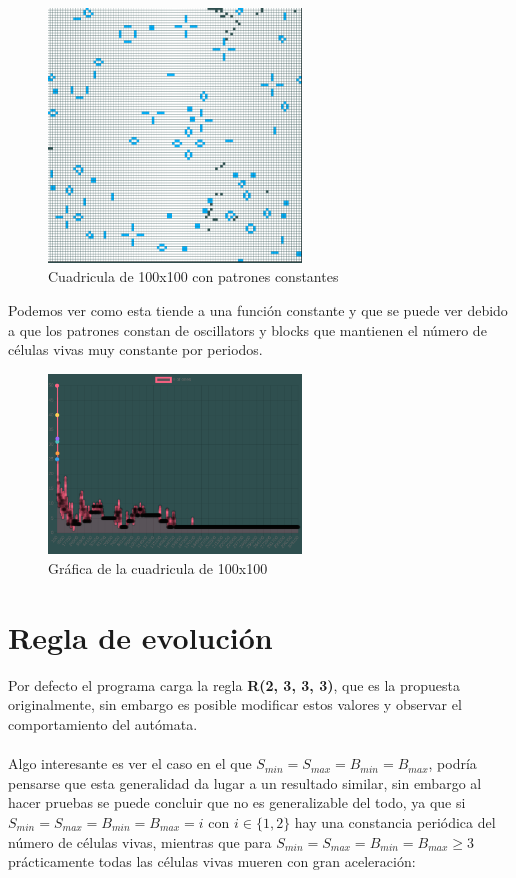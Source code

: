 \begin{figure}[h]
	\centering
	\includegraphics[width=0.6\textwidth]{capitulo2/images/time_grid.png}
	\caption{Cuadricula de 100x100 con patrones constantes}
	\label{fig:time_grid}
\end{figure}
Podemos ver como esta tiende a una función constante y que se puede ver debido a que los patrones constan de oscillators y blocks que mantienen el número de células vivas muy constante por periodos.
\begin{figure}[h]
	\centering
	\includegraphics[width=0.6\textwidth]{capitulo2/images/time_plot.png}
	\caption{Gráfica de la cuadricula de 100x100}
	\label{fig:time_plot}
\end{figure}
\newpage
\section{Regla de evolución}
Por defecto el programa carga la regla \textbf{R(2, 3, 3, 3)}, que es la propuesta originalmente, sin embargo es posible modificar estos valores y observar el comportamiento del autómata.
\\\\
Algo interesante es ver el caso en el que $S_{min} = S_{max} = B_{min} = B_{max}$, podría pensarse que esta generalidad da lugar a un resultado similar, sin embargo 
al hacer pruebas se puede concluir que no es generalizable del todo, ya que si $S_{min} = S_{max} = B_{min} = B_{max} = i$ con $i \in \{1,2\}$ hay una constancia periódica del número de células vivas, mientras que para $S_{min} = S_{max} = B_{min} = B_{max} \geq 3$ prácticamente todas las células vivas mueren con gran aceleración: 
\newpage
